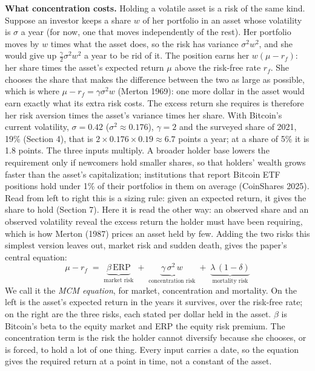 \documentclass[11pt]{article}
\begin{document}
\textbf{What concentration costs.} Holding a volatile asset is a risk of the same kind. Suppose an investor keeps a share $w$ of her portfolio in an asset whose volatility is $\sigma$ a year (for now, one that moves independently of the rest). Her portfolio moves by $w$ times what the asset does, so the risk has variance $\sigma^2 w^2$, and she would give up $\frac{\gamma}{2}\sigma^2 w^2$ a year to be rid of it. The position earns her $w(\mu - r_f)$: her share times the asset's expected return $\mu$ above the risk-free rate $r_f$. She chooses the share that makes the difference between the two as large as possible, which is where $\mu - r_f = \gamma\sigma^2 w$ (Merton 1969): one more dollar in the asset would earn exactly what its extra risk costs. The excess return she requires is therefore her risk aversion times the asset's variance times her share. With Bitcoin's current volatility, $\sigma = 0.42$ ($\sigma^2 \approx 0.176$), $\gamma = 2$ and the surveyed share of 2021, 19\% (Section 4), that is $2 \times 0.176 \times 0.19 \approx 6.7$ points a year; at a share of 5\% it is 1.8 points. The three inputs multiply. A broader holder base lowers the requirement only if newcomers hold smaller shares, so that holders' wealth grows faster than the asset's capitalization; institutions that report Bitcoin ETF positions hold under 1\% of their portfolios in them on average (CoinShares 2025). Read from left to right this is a sizing rule: given an expected return, it gives the share to hold (Section 7). Here it is read the other way: an observed share and an observed volatility reveal the excess return the holder must have been requiring, which is how Merton (1987) prices an asset held by few. Adding the two risks this simplest version leaves out, market risk and sudden death, gives the paper's central equation:
\begin{equation}
\boxed{\;\mu - r_f \;=\; \underbrace{\beta\,\mathrm{ERP}}_{\text{market risk}} \;+\; \underbrace{\gamma\,\sigma^2\,w}_{\text{concentration risk}} \;+\; \underbrace{\lambda\,(1-\delta)}_{\text{mortality risk}}\;}
\label{eq:foc}
\end{equation}
We call it the \emph{MCM equation}, for market, concentration and mortality. On the left is the asset's expected return in the years it survives, over the risk-free rate; on the right are the three risks, each stated per dollar held in the asset. $\beta$ is Bitcoin's beta to the equity market and ERP the equity risk premium. The concentration term is the risk the holder cannot diversify because she chooses, or is forced, to hold a lot of one thing. Every input carries a date, so the equation gives the required return at a point in time, not a constant of the asset.
\end{document}
